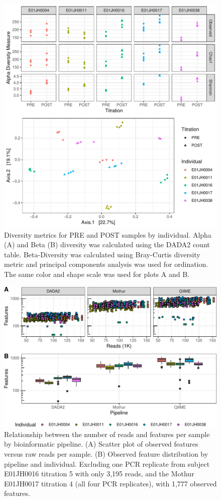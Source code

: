 \documentclass[12pt]{article}
\begin{document}
\begin{figure}
\centering
\includegraphics[width=0.9\linewidth]{sample_div.pdf}
\caption{\label{fig:sampleDiversity} Diversity metrics for PRE and POST samples by individual. 
Alpha (A) and Beta (B) diversity was calculated using the DADA2 count table. 
Beta-Diversity was calculated using Bray-Curtis diversity metric and principal components analysis was used for ordination. The same color and shape scale was used for plots A and B.}
\end{figure}

\begin{figure}
\centering
\includegraphics[width=0.9\linewidth]{readsVfeats-1.pdf}
\caption{\label{fig:readsVfeats}Relationship between the number of reads and
features per sample by bioinformatic pipeline. (A) Scatter plot of
observed features versus raw reads per sample. (B) Observed
feature distribution by pipeline and individual. Excluding one PCR
replicate from subject E01JH0016 titration 5 with only 3,195 reads, and
the Mothur E01JH0017 titration 4 (all four PCR replicates), with 1,777
observed features.}
\end{figure}
\end{document}
